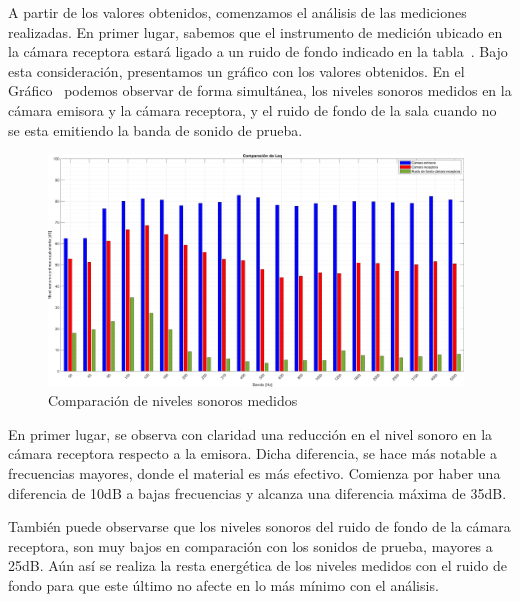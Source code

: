 \par A partir de los valores obtenidos, comenzamos el análisis de las mediciones realizadas. En primer lugar, sabemos que el instrumento de medición ubicado en la cámara receptora estará ligado a un ruido de fondo indicado en la tabla~. Bajo esta consideración, presentamos un gráfico con los valores obtenidos. En el Gráfico~ podemos observar de forma simultánea, los niveles sonoros medidos en la cámara emisora y la cámara receptora, y el ruido de fondo de la sala cuando no se esta emitiendo la banda de sonido de prueba.


\begin{figure}[H]
	\centering
	\includegraphics[width=0.98\textwidth]{./img/Comparacion_Leq_bars.png}
	\caption{Comparación de niveles sonoros medidos}
	\label{fig::comparacion_niveles_sonoros}
\end{figure}


\par En primer lugar, se observa con claridad una reducción en el nivel sonoro en la cámara receptora respecto a la emisora. Dicha diferencia, se hace más notable a frecuencias mayores, donde el material es más efectivo. Comienza por haber una diferencia de 10dB a bajas frecuencias y alcanza una diferencia máxima de 35dB. 


\par También puede observarse que los niveles sonoros del ruido de fondo de la cámara receptora, son muy bajos en comparación con los sonidos de prueba, mayores  a 25dB. Aún así se realiza la resta energética de los niveles medidos con el ruido de fondo para que este último no afecte en lo más mínimo con el análisis.\\

